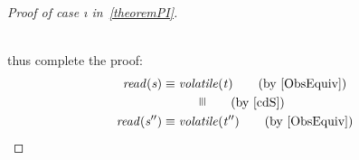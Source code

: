 \begin{proof}[Proof of case \i{\actwc} in\ \cref{theoremPI}]
\begin{figure*} [b]
		\caption{Complete proof sketch of case \i{\actwc} in \cref{theoremPI}}
		\label{casewPI2}
	\end{figure*}\\
	thus complete the proof:
\begin{align*}
	\i{read(s)}   &\equiv \i{volatile(t)}   \tag{by \cref{ObsEquiv}} \\
	& \qquad \quad \rotatebox{90}{$\equiv$} \tag{by \cref{cdS}}\\
	\i{read(s'')} &\equiv \i{volatile(t'')} \tag{by \cref{ObsEquiv}}
\end{align*}
\end{proof} 